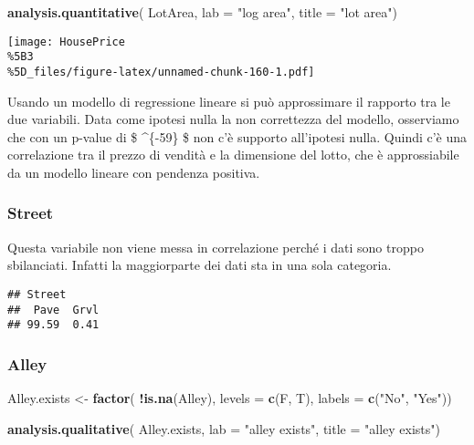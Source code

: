 \documentclass[
]{article}
\newenvironment{Shaded}{\begin{snugshade}}{\end{snugshade}}
\newcommand{\AttributeTok}[1]{\textcolor[rgb]{0.13,0.29,0.53}{#1}}
\newcommand{\FunctionTok}[1]{\textcolor[rgb]{0.13,0.29,0.53}{\textbf{#1}}}
\newcommand{\NormalTok}[1]{#1}
\newcommand{\OtherTok}[1]{\textcolor[rgb]{0.56,0.35,0.01}{#1}}
\newcommand{\SpecialCharTok}[1]{\textcolor[rgb]{0.81,0.36,0.00}{\textbf{#1}}}
\newcommand{\StringTok}[1]{\textcolor[rgb]{0.31,0.60,0.02}{#1}}
\begin{document}
\begin{Shaded}
\begin{Highlighting}[]
\FunctionTok{analysis.quantitative}\NormalTok{(}
\NormalTok{    LotArea,}
    \AttributeTok{lab =} \StringTok{"log area"}\NormalTok{,}
    \AttributeTok{title =} \StringTok{"lot area"}\NormalTok{)}
\end{Highlighting}
\end{Shaded}

\texttt{[image: HousePrice\\\%5B3\\\%5D\_files/figure-latex/unnamed-chunk-160-1.pdf]}

Usando un modello di regressione lineare si può approssimare il rapporto
tra le due variabili. Data come ipotesi nulla la non correttezza del
modello, osserviamo che con un p-value di \$ \^{}\{-59\} \$
non c'è supporto all'ipotesi nulla. Quindi c'è una correlazione tra il
prezzo di vendità e la dimensione del lotto, che è approssiabile da un
modello lineare con pendenza positiva.

\subsubsection{Street}\label{street-1}

Questa variabile non viene messa in correlazione perché i dati sono
troppo sbilanciati. Infatti la maggiorparte dei dati sta in una sola
categoria.

\begin{verbatim}
## Street
##  Pave  Grvl 
## 99.59  0.41
\end{verbatim}

\subsubsection{Alley}\label{alley-1}

\begin{Shaded}
\begin{Highlighting}[]
\NormalTok{Alley.exists }\OtherTok{\textless{}{-}} \FunctionTok{factor}\NormalTok{(}
    \SpecialCharTok{!}\FunctionTok{is.na}\NormalTok{(Alley), }
    \AttributeTok{levels =} \FunctionTok{c}\NormalTok{(F, T), }
    \AttributeTok{labels =} \FunctionTok{c}\NormalTok{(}\StringTok{"No"}\NormalTok{, }\StringTok{"Yes"}\NormalTok{))}

\FunctionTok{analysis.qualitative}\NormalTok{(}
\NormalTok{    Alley.exists,}
    \AttributeTok{lab =} \StringTok{"alley exists"}\NormalTok{,}
    \AttributeTok{title =} \StringTok{"alley exists"}\NormalTok{)}
\end{Highlighting}
\end{Shaded}
\end{document}

